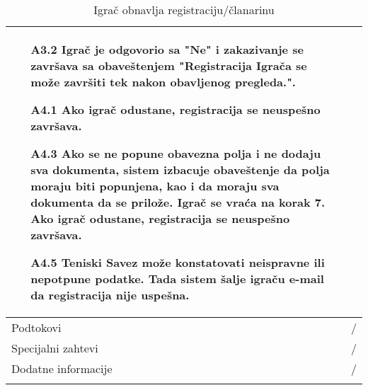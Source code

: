 \documentclass{article}
\begin{document}
\begin{longtable}{| p{} | p{} |}
                \begin{itemize}
                    \item[A3.2] Igrač je odgovorio sa "Ne" i zakazivanje se završava sa obaveštenjem "Registracija Igrača se može završiti tek nakon obavljenog pregleda.".
                    \item[A4.1] Ako igrač odustane, registracija se neuspešno završava.
                    \item[A4.3] Ako se ne popune obavezna polja i ne dodaju sva dokumenta, sistem izbacuje obaveštenje da polja moraju biti popunjena, kao i da moraju sva dokumenta da se prilože. Igrač se vraća na korak 7. Ako igrač odustane, registracija se neuspešno završava.
                    \item[A4.5] Teniski Savez može konstatovati neispravne ili nepotpune podatke. Tada sistem šalje igraču e-mail da registracija nije uspešna.
                \end{itemize}\\
            \hline
                Podtokovi & /\\
            \hline
                Specijalni zahtevi & /\\
            \hline
                Dodatne informacije & / \\
            \hline
            \caption{Igrač obnavlja registraciju/članarinu}
        \end{longtable}
        
\end{document}
